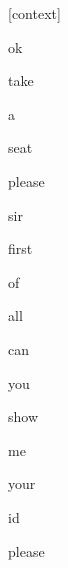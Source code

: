 \documentclass[varwidth]{standalone}
\begin{document}
\begin{CJK*}{UTF8}{gbsn}
{\setlength{\fboxsep}{0pt}\colorbox{white!0}{\parbox{0.9\textwidth}{
\colorbox{red!5.308368185936909e-16}{\strut [context]} \colorbox{red!4.573748810798861e-06}{\strut ok} \colorbox{red!1.973496182472445e-06}{\strut take} \colorbox{red!1.403126043442171e-05}{\strut a} \colorbox{red!0.00014981573622208089}{\strut seat} \colorbox{red!0.9295123815536499}{\strut please} \colorbox{red!0.031243136152625084}{\strut sir} \colorbox{red!2.9575874577858485e-05}{\strut first} \colorbox{red!0.00034190298174507916}{\strut of} \colorbox{red!0.002934762043878436}{\strut all} \colorbox{red!0.03782806918025017}{\strut can} \colorbox{red!0.22518883645534515}{\strut you} \colorbox{red!1.1088855266571045}{\strut show} \colorbox{red!49.076454162597656}{\strut me} \colorbox{red!45.50914001464844}{\strut your} \colorbox{red!0.0009112726547755301}{\strut id} \colorbox{red!3.077357530593872}{\strut please} 
}}}
\end{CJK*}
\end{document}
